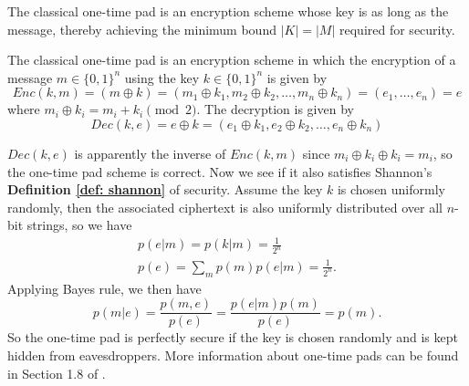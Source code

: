 \bigskip
The classical one-time pad is an encryption scheme whose key is as long as the message, thereby achieving the minimum bound $|K|=|M|$ required for security.

\begin{definition} \label{def: classical one-time pad scheme}
The classical one-time pad is an encryption scheme in which the encryption of a message $m \in \{0, 1\}^n$ using the key $k \in \{0, 1\}^n$ is given by
\begin{equation}
    Enc(k,m)=(m \oplus k)=(m_1 \oplus k_1, m_2 \oplus k_2, \hdots, m_n \oplus k_n)=(e_1, \hdots, e_n)=e
\end{equation}
where $m_i \oplus k_i = m_i + k_i \pmod{2}$. The decryption is given by
\begin{equation}
Dec(k, e)=e \oplus k = (e_1 \oplus k_1, e_2 \oplus k_2, \hdots, e_n \oplus k_n)
\end{equation}
\end{definition}

$Dec(k,e)$ is apparently the inverse of $Enc(k,m)$ since $m_i \oplus k_i \oplus k_i=m_i$, so the one-time pad scheme is correct. Now we see if it also satisfies Shannon's \textbf{Definition \ref{def: shannon}} of security. Assume the key $k$ is chosen uniformly randomly, then the associated ciphertext is also uniformly distributed over all $n$-bit strings, so we have 
\begin{gather}
    p(e|m)=p(k|m)=\frac{1}{2^n}\\
    p(e)=\sum_m p(m) p(e|m)=\frac{1}{2^n}.
\end{gather}
Applying Bayes rule, we then have $$p(m|e)=\frac{p(m,e)}{p(e)}=\frac{p(e|m)p(m)}{p(e)}=p(m).$$
So the one-time pad is perfectly secure if the key is chosen randomly and is kept hidden from eavesdroppers. More information about one-time pads can be found in Section 1.8 of \cite{Wehner:notes}.

